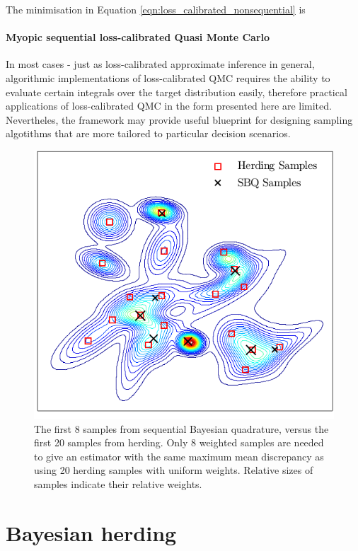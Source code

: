 The minimisation in Equation \eqref{eqn:loss_calibrated_nonsequential} is 
\paragraph{Myopic sequential loss-calibrated Quasi Monte Carlo}


In most cases - just as loss-calibrated approximate inference in general, algorithmic implementations of loss-calibrated QMC requires the ability to evaluate certain integrals over the target distribution easily, therefore practical applications of loss-calibrated QMC in the form presented here are limited. Nevertheles, the framework may provide useful blueprint for designing sampling algotithms that are more tailored to particular decision scenarios.

\begin{figure}[h]
\centering
\includegraphics[width=\columnwidth]{figs/herding/fig1_v2}
\caption[Sequential Bayesian quadrature versus kernel herding]{The first 8 samples from sequential Bayesian quadrature, versus the first 20 samples from herding.  Only 8 weighted \sbq{} samples are needed to give an estimator with the same maximum mean discrepancy as using 20 herding samples with uniform weights.  Relative sizes of samples indicate their relative weights.}
\label{fig:fig1}
\end{figure} 

\section{Bayesian herding}

